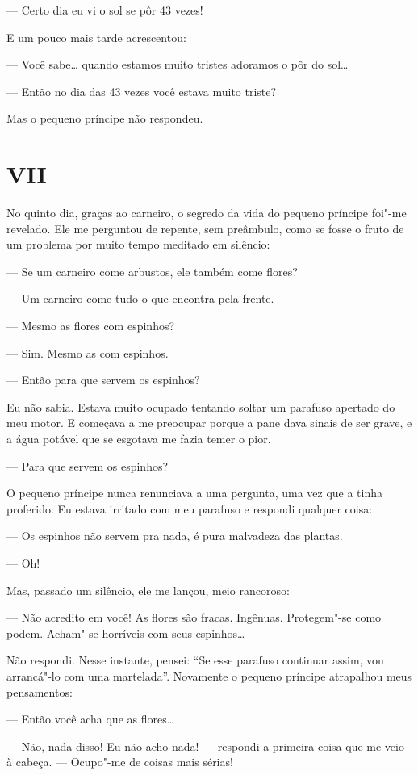 \begin{Parallel}[p]{}{}
{--- Certo dia eu vi o sol se pôr 43 vezes!

E um pouco mais tarde acrescentou:

--- Você sabe\ldots{} quando estamos muito tristes adoramos o pôr do sol\ldots{}

--- Então no dia das 43 vezes você estava muito triste?

Mas o pequeno príncipe não respondeu.

\section{VII}

No quinto dia, graças ao carneiro, o segredo da vida do pequeno príncipe
foi"-me revelado. Ele me perguntou de repente, sem preâmbulo, como se
fosse o fruto de um problema por muito tempo meditado em silêncio:

--- Se um carneiro come arbustos, ele também come flores?

--- Um carneiro come tudo o que encontra pela frente.

--- Mesmo as flores com espinhos?

--- Sim. Mesmo as com espinhos.

--- Então para que servem os espinhos?

Eu não sabia. Estava muito ocupado tentando soltar um parafuso apertado
do meu motor. E começava a me preocupar porque a pane dava sinais de ser
grave, e a água potável que se esgotava me fazia temer o pior.

--- Para que servem os espinhos?

O pequeno príncipe nunca renunciava a uma pergunta, uma vez que a tinha
proferido. Eu estava irritado com meu parafuso e respondi qualquer
coisa:

--- Os espinhos não servem pra nada, é pura malvadeza das plantas.

--- Oh!

Mas, passado um silêncio, ele me lançou, meio rancoroso:

--- Não acredito em você! As flores são fracas. Ingênuas. Protegem"-se como
podem. Acham"-se horríveis com seus espinhos\ldots{}

Não respondi. Nesse instante, pensei: ``Se esse parafuso continuar
assim, vou arrancá"-lo com uma martelada''. Novamente o pequeno príncipe
atrapalhou meus pensamentos:

--- Então você acha que as flores\ldots{}

--- Não, nada disso! Eu não acho nada! --- respondi a primeira coisa que me
veio à cabeça. --- Ocupo"-me de coisas mais sérias!

}
\end{Parallel}
